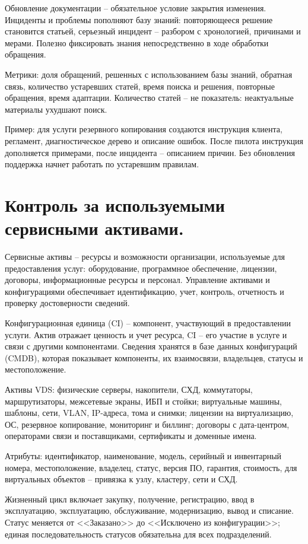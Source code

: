 \documentclass[14pt,a4paper]{extarticle}
\begin{document}
Обновление документации -- обязательное условие закрытия изменения. Инциденты и
проблемы пополняют базу знаний: повторяющееся решение становится статьей,
серьезный инцидент -- разбором с хронологией, причинами и мерами. Полезно
фиксировать знания непосредственно в ходе обработки обращения.

Метрики: доля обращений, решенных с использованием базы знаний, обратная связь,
количество устаревших статей, время поиска и решения, повторные обращения, время
адаптации. Количество статей -- не показатель: неактуальные материалы ухудшают
поиск.

Пример: для услуги резервного копирования создаются инструкция клиента,
регламент, диагностическое дерево и описание ошибок. После пилота инструкция
дополняется примерами, после инцидента -- описанием причин. Без обновления
поддержка начнет работать по устаревшим правилам.

\section{Контроль за используемыми сервисными активами.}

Сервисные активы -- ресурсы и возможности организации, используемые для
предоставления услуг: оборудование, программное обеспечение, лицензии, договоры,
информационные ресурсы и персонал. Управление активами и конфигурациями
обеспечивает идентификацию, учет, контроль, отчетность и проверку достоверности
сведений.

Конфигурационная единица (CI) -- компонент, участвующий в предоставлении услуги.
Актив отражает ценность и учет ресурса, CI -- его участие в услуге и связи с
другими компонентами. Сведения хранятся в базе данных конфигураций (CMDB),
которая показывает компоненты, их взаимосвязи, владельцев, статусы и
местоположение.

Активы VDS: физические серверы, накопители, СХД, коммутаторы, маршрутизаторы,
межсетевые экраны, ИБП и стойки; виртуальные машины, шаблоны, сети, VLAN,
IP-адреса, тома и снимки; лицензии на виртуализацию, ОС, резервное копирование,
мониторинг и биллинг; договоры с дата-центром, операторами связи и поставщиками,
сертификаты и доменные имена.

Атрибуты: идентификатор, наименование, модель, серийный и инвентарный номера,
местоположение, владелец, статус, версия ПО, гарантия, стоимость, для виртуальных
объектов -- привязка к узлу, кластеру, сети и СХД.

Жизненный цикл включает закупку, получение, регистрацию, ввод в эксплуатацию,
эксплуатацию, обслуживание, модернизацию, вывод и списание. Статус меняется от
<<Заказано>> до <<Исключено из конфигурации>>; единая последовательность статусов
обязательна для всех подразделений.
\end{document}

